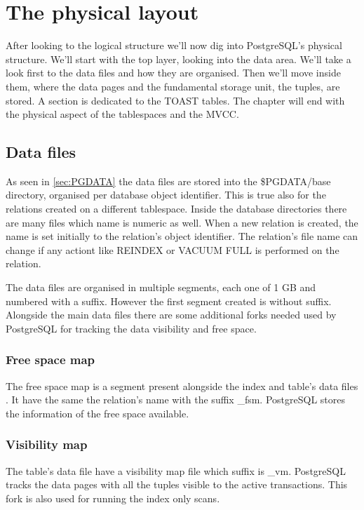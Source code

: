 \chapter{The physical layout}
\label{cha:PHYLAY}
After looking to the logical structure we'll now dig into PostgreSQL's physical structure. 
We'll start with the top layer, looking into the data area. We'll take a look first to the 
data files and how they are organised. Then we'll move inside them, where the data pages 
and the fundamental storage unit, the tuples, are stored. A section is dedicated to the 
TOAST tables. The chapter will end with the physical aspect of the tablespaces and the 
MVCC.

\section{Data files}
As seen in \ref{sec:PGDATA} the data files are stored into the \$PGDATA/base directory, 
organised per database object identifier. This is true also for the relations created 
on a different tablespace. Inside the database directories there are many files which 
name is numeric as well. When a new relation is created, the name is set initially to the 
relation's object identifier. The relation's file name can change if any actiont like 
REINDEX or VACUUM FULL is performed on the relation.\newline

The data files are organised in multiple segments, each one of 1 GB and numbered with a 
suffix. However the first segment created is without suffix. Alongside the main data 
files there are some additional forks needed used by PostgreSQL for tracking the data 
visibility and free space.

\subsection{Free space map}
The free space map is a segment present alongside the index and 
table's data files . It have the same the relation's name with the suffix \_fsm. 
PostgreSQL stores the information of the free space available. 

\subsection{Visibility map}
The table's data file have a visibility map file which suffix is \_vm. PostgreSQL 
tracks the data pages with all the tuples visible to the active transactions. This fork 
is also used for running the index only scans.


